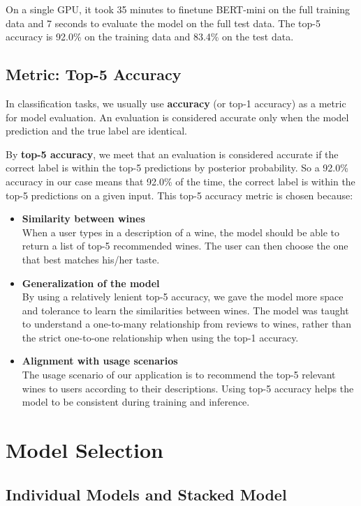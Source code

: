 \documentclass[
]{kaohandt}
\begin{document}
On a single GPU, it took 35 minutes to finetune BERT-mini on the full training data and 7 seconds to evaluate the model on the full test data. The top-5 accuracy is 92.0\% on the training data and 83.4\% on the test data.

\subsection*{Metric: Top-5 Accuracy}

In classification tasks, we usually use \textbf{accuracy} (or top-1 accuracy) as a metric for model evaluation. An evaluation is considered accurate only when the model prediction and the true label are identical.

By \textbf{top-5 accuracy}, we meet that an evaluation is considered accurate if the correct label is within the top-5 predictions by posterior probability. So a 92.0\% accuracy in our case means that 92.0\% of the time, the correct label is within the top-5 predictions on a given input. This top-5 accuracy metric is chosen because:

\begin{itemize}
	\item \textbf{Similarity between wines} \\
	When a user types in a description of a wine, the model should be able to return a list of top-5 recommended wines. The user can then choose the one that best matches his/her taste.
	\item \textbf{Generalization of the model} \\
	By using a relatively lenient top-5 accuracy, we gave the model more space and tolerance to learn the similarities between wines. The model was taught to understand a one-to-many relationship from reviews to wines, rather than the strict one-to-one relationship when using the top-1 accuracy.
	\item \textbf{Alignment with usage scenarios} \\
	The usage scenario of our application is to recommend the top-5 relevant wines to users according to their descriptions. Using top-5 accuracy helps the model to be consistent during training and inference.
\end{itemize}

\section{Model Selection}

\subsection*{Individual Models and Stacked Model}
\end{document}
